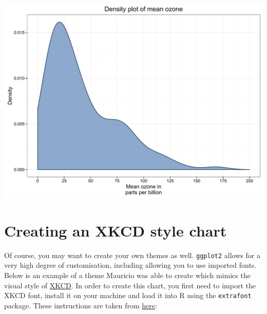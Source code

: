 \begin{Shaded}
\begin{Highlighting}[]
\StringTok{ }\StringTok{ }\NormalTok{()}
\end{Highlighting}
\end{Shaded}

\begin{center}\includegraphics[width=0.55\linewidth]{figures/density_9-1} \end{center}

\section{Creating an XKCD style
chart}\label{creating-an-xkcd-style-chart-7}

Of course, you may want to create your own themes as well.
\texttt{ggplot2} allows for a very high degree of customisation,
including allowing you to use imported fonts. Below is an example of a
theme Mauricio was able to create which mimics the visual style of
\href{http://xkcd.com/}{XKCD}. In order to create this chart, you first
need to import the XKCD font, install it on your machine and load it
into R using the \texttt{extrafont} package. These instructions are
taken from
\href{https://www.google.com.au/url?sa=t\&rct=j\&q=\&esrc=s\&source=web\&cd=1\&ved=0ahUKEwiWzafchdPJAhVBpJQKHe_LDT8QFggbMAA\&url=https\%3A\%2F\%2Fcran.r-project.org\%2Fweb\%2Fpackages\%2Fxkcd\%2Fvignettes\%2Fxkcd-intro.pdf\&usg=AFQjCNE-KciGY14e-Q1buYIVmTFC0ht__Q\&sig2=DZUwkvIHwfNWtTtkcz94jg}{here}:

\begin{Shaded}
\begin{Highlighting}[]

\NormalTok{(}\NormalTok{, }
\StringTok{      }\NormalTok{, }\NormalTok{)}
\NormalTok{(}\NormalTok{)}
\NormalTok{(}\NormalTok{)}
\NormalTok{(} \NormalTok{, }\NormalTok{)}
\NormalTok{()}
\NormalTok{()}
\end{Highlighting}
\end{Shaded}


